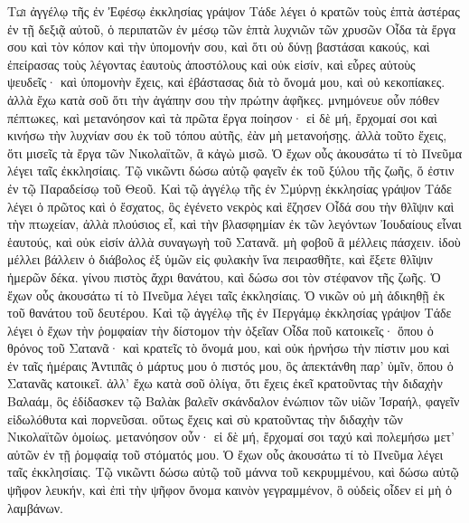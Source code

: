 \begin{pages}
    \begin{Rightside}
        \beginnumbering
			\renewcommand{\LettrineFontHook}{\PHtitl}
			\lettrine[lines=3]{Τ}{ῷ} ἀγγέλῳ τῆς ἐν Ἐφέσῳ ἐκκλησίας γράψον Τάδε λέγει ὁ κρατῶν τοὺς ἑπτὰ ἀστέρας ἐν τῇ δεξιᾷ αὐτοῦ, ὁ περιπατῶν ἐν μέσῳ τῶν ἑπτὰ λυχνιῶν τῶν χρυσῶν Οἶδα τὰ ἔργα σου καὶ τὸν κόπον καὶ τὴν ὑπομονήν σου, καὶ ὅτι οὐ δύνῃ βαστάσαι κακούς, καὶ ἐπείρασας τοὺς λέγοντας ἑαυτοὺς ἀποστόλους καὶ οὐκ εἰσίν, καὶ εὗρες αὐτοὺς ψευδεῖς· καὶ ὑπομονὴν ἔχεις, καὶ ἐβάστασας διὰ τὸ ὄνομά μου, καὶ οὐ κεκοπίακες. 
		\pend 
		\pstart
			ἀλλὰ ἔχω κατὰ σοῦ ὅτι τὴν ἀγάπην σου τὴν πρώτην ἀφῆκες. μνημόνευε οὖν πόθεν πέπτωκες, καὶ μετανόησον καὶ τὰ πρῶτα ἔργα ποίησον· εἰ δὲ μή, ἔρχομαί σοι καὶ κινήσω τὴν λυχνίαν σου ἐκ τοῦ τόπου αὐτῆς, ἐὰν μὴ μετανοήσῃς.
		\pend
		\pstart
			ἀλλὰ τοῦτο ἔχεις, ὅτι μισεῖς τὰ ἔργα τῶν Νικολαϊτῶν, ἃ κἀγὼ μισῶ. Ὁ ἔχων οὖς ἀκουσάτω τί τὸ Πνεῦμα λέγει ταῖς ἐκκλησίαις. Τῷ νικῶντι δώσω αὐτῷ φαγεῖν ἐκ τοῦ ξύλου τῆς ζωῆς, ὅ ἐστιν ἐν τῷ Παραδείσῳ τοῦ Θεοῦ.
		\pend
		\pstart
			Καὶ τῷ ἀγγέλῳ τῆς ἐν Σμύρνῃ ἐκκλησίας γράψον Τάδε λέγει ὁ πρῶτος καὶ ὁ ἔσχατος, ὃς ἐγένετο νεκρὸς καὶ ἔζησεν Οἶδά σου τὴν θλῖψιν καὶ τὴν πτωχείαν, ἀλλὰ πλούσιος εἶ, καὶ τὴν βλασφημίαν ἐκ τῶν λεγόντων Ἰουδαίους εἶναι ἑαυτούς, καὶ οὐκ εἰσίν ἀλλὰ συναγωγὴ τοῦ Σατανᾶ. μὴ φοβοῦ ἃ μέλλεις πάσχειν. ἰδοὺ μέλλει βάλλειν ὁ διάβολος ἐξ ὑμῶν εἰς φυλακὴν ἵνα πειρασθῆτε, καὶ ἕξετε θλῖψιν ἡμερῶν δέκα. γίνου πιστὸς ἄχρι θανάτου, καὶ δώσω σοι τὸν στέφανον τῆς ζωῆς. Ὁ ἔχων οὖς ἀκουσάτω τί τὸ Πνεῦμα λέγει ταῖς ἐκκλησίαις. Ὁ νικῶν οὐ μὴ ἀδικηθῇ ἐκ τοῦ θανάτου τοῦ δευτέρου.
		\pend
		\pstart
			Καὶ τῷ ἀγγέλῳ τῆς ἐν Περγάμῳ ἐκκλησίας γράψον Τάδε λέγει ὁ ἔχων τὴν ῥομφαίαν τὴν δίστομον τὴν ὀξεῖαν Οἶδα ποῦ κατοικεῖς· ὅπου ὁ θρόνος τοῦ Σατανᾶ· καὶ κρατεῖς τὸ ὄνομά μου, καὶ οὐκ ἠρνήσω τὴν πίστιν μου καὶ ἐν ταῖς ἡμέραις Ἀντιπᾶς ὁ μάρτυς μου ὁ πιστός μου, ὃς ἀπεκτάνθη παρ’ ὑμῖν, ὅπου ὁ Σατανᾶς κατοικεῖ.
		\pend
		\pstart	
			ἀλλ’ ἔχω κατὰ σοῦ ὀλίγα, ὅτι ἔχεις ἐκεῖ κρατοῦντας τὴν διδαχὴν Βαλαάμ, ὃς ἐδίδασκεν τῷ Βαλὰκ βαλεῖν σκάνδαλον ἐνώπιον τῶν υἱῶν Ἰσραήλ, φαγεῖν εἰδωλόθυτα καὶ πορνεῦσαι. οὕτως ἔχεις καὶ σὺ κρατοῦντας τὴν διδαχὴν τῶν Νικολαϊτῶν ὁμοίως. μετανόησον οὖν· εἰ δὲ μή, ἔρχομαί σοι ταχύ καὶ πολεμήσω μετ’ αὐτῶν ἐν τῇ ῥομφαίᾳ τοῦ στόματός μου. Ὁ ἔχων οὖς ἀκουσάτω τί τὸ Πνεῦμα λέγει ταῖς ἐκκλησίαις. Τῷ νικῶντι δώσω αὐτῷ τοῦ μάννα τοῦ κεκρυμμένου, καὶ δώσω αὐτῷ ψῆφον λευκήν, καὶ ἐπὶ τὴν ψῆφον ὄνομα καινὸν γεγραμμένον, ὃ οὐδεὶς οἶδεν εἰ μὴ ὁ λαμβάνων.

\end{Rightside}
\end{pages}

